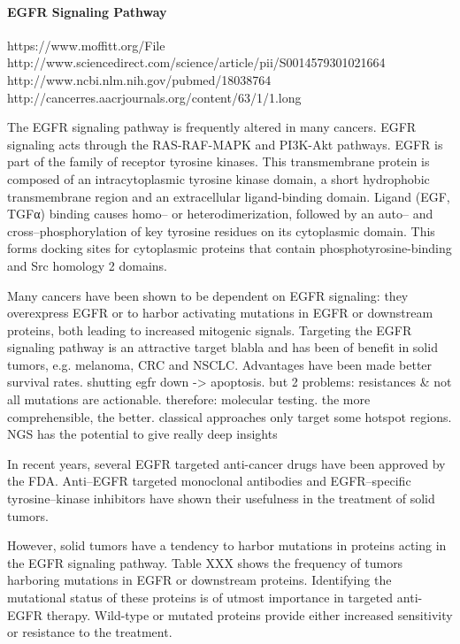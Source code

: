       \paragraph{EGFR Signaling Pathway}

https://www.moffitt.org/File%
http://www.sciencedirect.com/science/article/pii/S0014579301021664
http://www.ncbi.nlm.nih.gov/pubmed/18038764
http://cancerres.aacrjournals.org/content/63/1/1.long

      The EGFR signaling pathway is frequently altered in
      many cancers. EGFR signaling acts through the RAS-RAF-MAPK and PI3K-Akt pathways.
      EGFR is part of the family of receptor tyrosine kinases. This transmembrane
      protein is composed of an intracytoplasmic tyrosine kinase domain, a short
      hydrophobic transmembrane region and an extracellular ligand-binding domain.
      Ligand (EGF, TGFα) binding causes homo-- or heterodimerization, followed by
      an auto-- and cross--phosphorylation of key tyrosine residues on its
      cytoplasmic domain. This forms docking sites for cytoplasmic proteins that
      contain phosphotyrosine-binding and Src homology 2 domains.

      Many cancers have been shown to be dependent on EGFR signaling: they
      overexpress EGFR or to harbor activating mutations in EGFR or downstream
      proteins, both leading to increased mitogenic signals. Targeting the EGFR
      signaling pathway is an attractive target blabla and has been of benefit in
      solid tumors, e.g. melanoma, CRC and NSCLC. Advantages have been made better
      survival rates. shutting egfr down -> apoptosis. but 2 problems: resistances &
      not all mutations are actionable. therefore: molecular testing. the more
      comprehensible, the better. classical approaches only target some hotspot
      regions. NGS has the potential to give really deep insights

      In recent years, several EGFR targeted anti-cancer drugs have been
      approved by the FDA. Anti--EGFR targeted monoclonal antibodies and
      EGFR--specific tyrosine--kinase inhibitors have shown their usefulness in
      the treatment of solid tumors.

      However, solid tumors have a tendency to harbor mutations in proteins
      acting in  the EGFR signaling pathway. Table XXX shows the frequency of
      tumors  harboring mutations in EGFR or downstream proteins. Identifying
      the mutational status of these proteins is of utmost importance in
      targeted anti-EGFR therapy. Wild-type or mutated proteins provide either
      increased sensitivity or resistance to the treatment.

